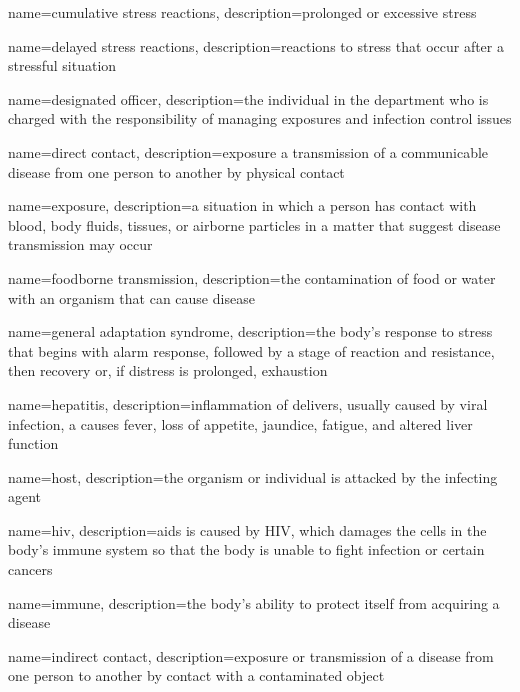 \documentclass[../../EMT-169.tex]{subfiles}
\begin{document}
	{
		name=cumulative stress reactions,
		description={prolonged or excessive stress}
	}
	
	{
		name=delayed stress reactions,
		description={reactions to stress that occur after a stressful situation}
	}
	
	{
		name=designated officer,
		description={the individual in the department who is charged with the responsibility of managing exposures and infection control issues}
	}
	
	{
		name=direct contact,
		description={exposure a transmission of a communicable disease from one person to another by physical contact}
	}
	
	{
		name=exposure,
		description={a situation in which a person has contact with blood, body fluids, tissues, or airborne particles in a matter that suggest disease transmission may occur}
	}
	
	{
		name=foodborne transmission,
		description={the contamination of food or water with an organism that can cause disease}
	}
	
	{
		name=general adaptation syndrome,
		description={the body’s response to stress that begins with alarm response, followed by a stage of reaction and resistance, then recovery or, if distress is prolonged, exhaustion}
	}
	
	{
		name=hepatitis,
		description={inflammation of delivers, usually caused by viral infection, a causes fever, loss of appetite, jaundice, fatigue, and altered liver function}
	}
	
	{
		name=host,
		description={the organism or individual is attacked by the infecting agent}
	}
	
	{
		name=\acrfull{hiv},
		description={\acrfull{aids} is caused by HIV, which damages the cells in the body’s immune system so that the body is unable to fight infection or certain cancers}
	}
	
	{
		name=immune,
		description={the body’s ability to protect itself from acquiring a disease}
	}
	
	{
		name=indirect contact,
		description={exposure or transmission of a disease from one person to another by contact with a contaminated object}
	}
	
\end{document}
